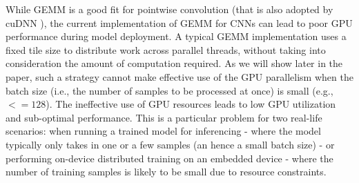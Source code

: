 While GEMM is a good fit for pointwise convolution (that is also adopted by cuDNN \cite{ChetlurWVCTCS14}), the current implementation of
GEMM for CNNs can lead to poor GPU performance during model deployment. A typical GEMM implementation uses a fixed tile size to distribute
work across parallel threads, without taking into consideration the amount of computation required. As we will show later in the paper,
such a strategy cannot make effective use of the GPU parallelism when the batch size (i.e., the number of samples to be processed at once)
is small (e.g., $<= 128$). The ineffective use of GPU resources leads to low GPU utilization and sub-optimal performance. This is a
particular problem for two real-life scenarios: when running a trained model for inferencing - where the model typically only takes in one
or a few samples (an hence a small batch size) - or performing on-device distributed training on an embedded device - where the number of
training samples is likely to be small due to resource constraints.



